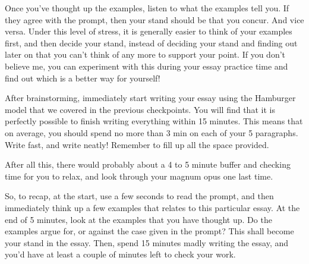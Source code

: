 Once you've thought up the examples, listen to what the examples tell you. If they agree with the prompt, then your stand should be that you concur. And vice versa. Under this level of stress, it is generally easier to think of your examples first, and then decide your stand, instead of deciding your stand and finding out later on that you can't think of any more to support your point. If you don't believe me, you can experiment with this during your essay practice time and find out which is a better way for yourself!

After brainstorming, immediately start writing your essay using the Hamburger model that we covered in the previous checkpoints. You will find that it is perfectly possible to finish writing everything within 15 minutes. This means that on average, you should spend no more than 3 min on each of your 5 paragraphs. Write fast, and write neatly! Remember to fill up all the space provided.

After all this, there would probably about a 4 to 5 minute buffer and checking time for you to relax, and look through your magnum opus one last time.

So, to recap, at the start, use a few seconds to read the prompt, and then immediately think up a few examples that relates to this particular essay. At the end of 5 minutes, look at the examples that you have thought up. Do the examples argue for, or against the case given in the prompt? This shall become your stand in the essay. Then, spend 15 minutes madly writing the essay, and you'd have at least a couple of minutes left to check your work.


